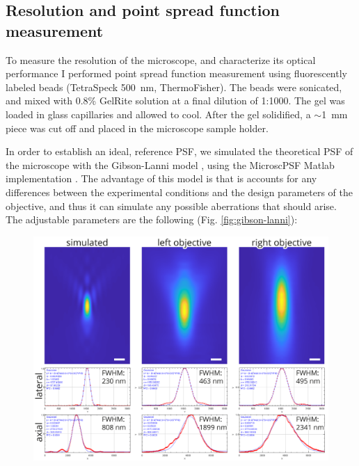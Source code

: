   \subsection{Resolution and point spread function measurement}
    To measure the resolution of the microscope, and characterize its optical performance I performed point spread function measurement using fluorescently labeled beads (TetraSpeck \SI{500}{nm}, ThermoFisher). The beads were sonicated, and mixed with 0.8\% GelRite solution at a final dilution of 1:1000. The gel was loaded in glass capillaries and allowed to cool. After the gel solidified, a $\sim$\SI{1}{mm} piece was cut off and placed in the microscope sample holder.

    In order to establish an ideal, reference PSF, we simulated the theoretical PSF of the microscope with the Gibson-Lanni model \cite{gibson_experimental_1992}, using the MicroscPSF Matlab implementation \cite{li_fast_2017}. The advantage of this model is that is accounts for any differences between the experimental conditions and the design parameters of the objective, and thus it can simulate any possible aberrations that should arise. The adjustable parameters are the following (Fig. \ref{fig:gibson-lanni}): 

    \begin{figure}[htb]
      \centering
      \includegraphics[width=\textwidth]{PSF}
      \label{fig:measuredPSF}
    \end{figure}